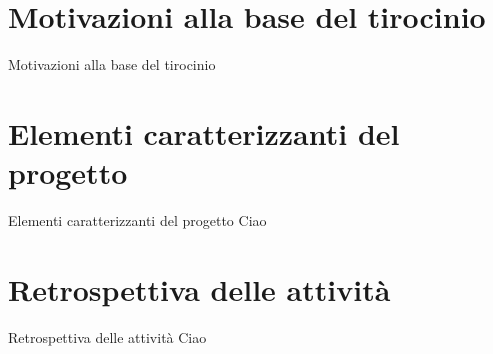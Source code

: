 \documentclass{beamer}
\begin{document}

	\section{Motivazioni alla base del tirocinio}
	\begin{frame}{Motivazioni alla base del tirocinio}


	\end{frame}

	\section{Elementi caratterizzanti del progetto}
	\begin{frame}{Elementi caratterizzanti del progetto}
		Ciao
	\end{frame} 

	\section{Retrospettiva delle attività} 
	\begin{frame}{Retrospettiva delle attività}
		Ciao
	\end{frame}
\end{document}
